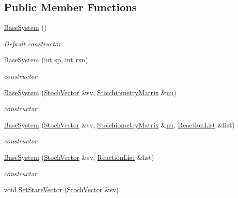\subsection*{Public Member Functions}
\begin{CompactItemize}
\item 
\hyperlink{class_base_system_77a342bf74a7e875f35ff1c70dd8c310}{BaseSystem} ()
\begin{CompactList}\small\item\em Default constructor. \item\end{CompactList}\item 
\hyperlink{class_base_system_7f28308a370855646f1e0a3f65719c24}{BaseSystem} (int sp, int rxn)
\begin{CompactList}\small\item\em constructor \item\end{CompactList}\item 
\hyperlink{class_base_system_8e6f4b7f9e6a955e45d07ed01754cbfa}{BaseSystem} (\hyperlink{class_stoch_vector}{StochVector} \&sv, \hyperlink{class_stoichiometry_matrix}{StoichiometryMatrix} \&\hyperlink{class_base_system_d664dd55778f4e00a06cb3583b4c27e8}{nu})
\begin{CompactList}\small\item\em constructor \item\end{CompactList}\item 
\hyperlink{class_base_system_b315499367770c8f34ca832c7692799e}{BaseSystem} (\hyperlink{class_stoch_vector}{StochVector} \&sv, \hyperlink{class_stoichiometry_matrix}{StoichiometryMatrix} \&\hyperlink{class_base_system_d664dd55778f4e00a06cb3583b4c27e8}{nu}, \hyperlink{class_reaction_list}{ReactionList} \&list)
\begin{CompactList}\small\item\em constructor \item\end{CompactList}\item 
\hyperlink{class_base_system_2aae59b374a42bf6926fa01f9a514e70}{BaseSystem} (\hyperlink{class_stoch_vector}{StochVector} \&sv, \hyperlink{class_reaction_list}{ReactionList} \&list)
\begin{CompactList}\small\item\em constructor \item\end{CompactList}\item 
\hypertarget{class_base_system_61a3ea022dc1c50f85dd112f4a5321b8}{
void \hyperlink{class_base_system_61a3ea022dc1c50f85dd112f4a5321b8}{SetStateVector} (\hyperlink{class_stoch_vector}{StochVector} \&sv)}
\label{class_base_system_61a3ea022dc1c50f85dd112f4a5321b8}


\end{CompactItemize}
